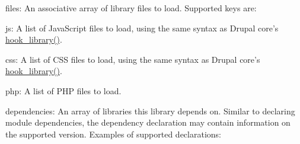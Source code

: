 \begin{DoxyItemize}
\item files: An associative array of library files to load. Supported keys are:
\begin{DoxyItemize}
\item js: A list of JavaScript files to load, using the same syntax as Drupal core's \hyperlink{group__hooks_ga6bf3f83fa2e373836f5aa78fd143d1cd}{hook\_\-library()}.
\item css: A list of CSS files to load, using the same syntax as Drupal core's \hyperlink{group__hooks_ga6bf3f83fa2e373836f5aa78fd143d1cd}{hook\_\-library()}.
\item php: A list of PHP files to load.
\end{DoxyItemize}
\item dependencies: An array of libraries this library depends on. Similar to declaring module dependencies, the dependency declaration may contain information on the supported version. Examples of supported declarations: 


\end{DoxyItemize}
